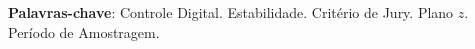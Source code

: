 \begin{resumo}


\vspace{\onelineskip}

\noindent
\textbf{Palavras-chave}: Controle Digital. Estabilidade. Critério de Jury.
Plano $z$. Período de Amostragem.

\end{resumo}
